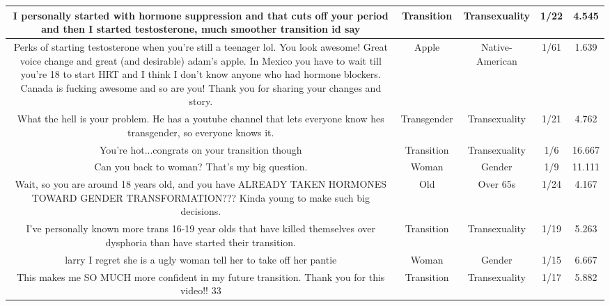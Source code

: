 \documentclass[11pt]{article}
\newlength\mylength
\begin{document}
\begin{center}
\begin{longtable}{|C{.40\mylength}|C{.30\mylength}|C{.15\mylength}|C{.15\mylength}|C{.15\mylength}|}
  I personally started with hormone suppression and that cuts off your period and then I started testosterone, much smoother transition id say  & Transition & Transexuality & 1/22 & 4.545 \\  \hline
  Perks of starting testosterone when you're still a teenager lol. You look awesome! Great voice change and great (and desirable) adam's apple. In Mexico you have to wait till you're 18 to start  HRT and I think I don't know anyone who had hormone blockers. Canada is fucking awesome and so are you! Thank you for sharing your changes and story.  & Apple & Native-American & 1/61 & 1.639 \\  \hline
  What the hell is your problem. He has a youtube channel that lets everyone know hes transgender, so everyone knows it.  & Transgender & Transexuality & 1/21 & 4.762 \\  \hline
  You're hot...congrats on your transition though  & Transition & Transexuality & 1/6 & 16.667 \\  \hline
  Can you back to woman? That's my big question.  & Woman & Gender & 1/9 & 11.111 \\  \hline
  Wait, so you are around 18 years old, and you have ALREADY TAKEN HORMONES TOWARD GENDER TRANSFORMATION??? Kinda young to make such big decisions.  & Old & Over 65s & 1/24 & 4.167 \\  \hline
  I've personally known more trans 16-19 year olds that have killed themselves over dysphoria than have started their transition.  & Transition & Transexuality & 1/19 & 5.263 \\  \hline
   larry I regret she is a ugly woman tell her to take off her pantie  & Woman & Gender & 1/15 & 6.667 \\  \hline
  This makes me SO MUCH more confident in my future transition. Thank you for this video!!  33  & Transition & Transexuality & 1/17 & 5.882 \\  \hline

\end{longtable}
\end{center}
\end{document}
